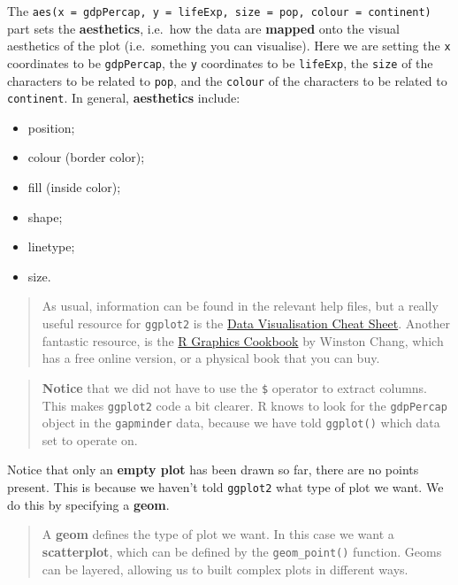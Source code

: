 \documentclass[]{book}
\providecommand{\tightlist}{%
  \setlength{\itemsep}{0pt}\setlength{\parskip}{0pt}}
\theoremstyle{definition}
\theoremstyle{definition}
\theoremstyle{definition}
\theoremstyle{remark}
\begin{document}
The
\texttt{aes(x\ =\ gdpPercap,\ y\ =\ lifeExp,\ size\ =\ pop,\ colour\ =\ continent)}
part sets the \textbf{aesthetics}, i.e.~how the data are \textbf{mapped}
onto the visual aesthetics of the plot (i.e.~something you can
visualise). Here we are setting the \texttt{x} coordinates to be
\texttt{gdpPercap}, the \texttt{y} coordinates to be \texttt{lifeExp},
the \texttt{size} of the characters to be related to \texttt{pop}, and
the \texttt{colour} of the characters to be related to
\texttt{continent}. In general, \textbf{aesthetics} include:

\begin{itemize}
\tightlist
\item
  position;
\item
  colour (border color);
\item
  fill (inside color);
\item
  shape;
\item
  linetype;
\item
  size.
\end{itemize}

\begin{quote}
As usual, information can be found in the relevant help files, but a
really useful resource for \texttt{ggplot2} is the
\href{https://www.rstudio.com/wp-content/uploads/2016/11/ggplot2-cheatsheet-2.1.pdf}{Data
Visualisation Cheat Sheet}. Another fantastic resource, is the
\href{http://www.cookbook-r.com/Graphs/}{R Graphics Cookbook} by Winston
Chang, which has a free online version, or a physical book that you can
buy.
\end{quote}

\begin{quote}
\textbf{Notice} that we did not have to use the \texttt{\$} operator to
extract columns. This makes \texttt{ggplot2} code a bit clearer. R knows
to look for the \texttt{gdpPercap} object in the \texttt{gapminder}
data, because we have told \texttt{ggplot()} which data set to operate
on.
\end{quote}

Notice that only an \textbf{empty plot} has been drawn so far, there are
no points present. This is because we haven't told \texttt{ggplot2} what
type of plot we want. We do this by specifying a \textbf{geom}.

\begin{quote}
A \textbf{geom} defines the type of plot we want. In this case we want a
\textbf{scatterplot}, which can be defined by the \texttt{geom\_point()}
function. Geoms can be layered, allowing us to built complex plots in
different ways.
\end{quote}
\end{document}
